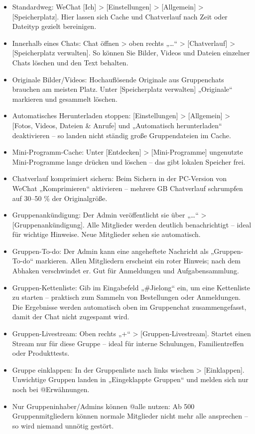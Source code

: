 \begin{itemize}
  \item Standardweg: WeChat [Ich] > [Einstellungen] > [Allgemein] > [Speicherplatz]. Hier lassen sich Cache und Chatverlauf nach Zeit oder Dateityp gezielt bereinigen.
  \item Innerhalb eines Chats: Chat öffnen > oben rechts „…“ > [Chatverlauf] > [Speicherplatz verwalten]. So können Sie Bilder, Videos und Dateien einzelner Chats löschen und den Text behalten.
  \item Originale Bilder/Videos: Hochauflösende Originale aus Gruppenchats brauchen am meisten Platz. Unter [Speicherplatz verwalten] „Originale“ markieren und gesammelt löschen.
  \item Automatisches Herunterladen stoppen: [Einstellungen] > [Allgemein] > [Fotos, Videos, Dateien \& Anrufe] und „Automatisch herunterladen“ deaktivieren – so landen nicht ständig große Gruppendateien im Cache.
  \item Mini-Programm-Cache: Unter [Entdecken] > [Mini-Programme] ungenutzte Mini-Programme lange drücken und löschen – das gibt lokalen Speicher frei.
  \item Chatverlauf komprimiert sichern: Beim Sichern in der PC-Version von WeChat „Komprimieren“ aktivieren – mehrere GB Chatverlauf schrumpfen auf 30–50 \% der Originalgröße.
\end{itemize}


\begin{itemize}
  \item Gruppenankündigung: Der Admin veröffentlicht sie über „…“ > [Gruppenankündigung]. Alle Mitglieder werden deutlich benachrichtigt – ideal für wichtige Hinweise. Neue Mitglieder sehen sie automatisch.
  \item Gruppen-To-do: Der Admin kann eine angeheftete Nachricht als „Gruppen-To-do“ markieren. Allen Mitgliedern erscheint ein roter Hinweis; nach dem Abhaken verschwindet er. Gut für Anmeldungen und Aufgabensammlung.
  \item Gruppen-Kettenliste: Gib im Eingabefeld „\#Jielong“ ein, um eine Kettenliste zu starten – praktisch zum Sammeln von Bestellungen oder Anmeldungen. Die Ergebnisse werden automatisch oben im Gruppenchat zusammengefasst, damit der Chat nicht zugespamt wird.
  \item Gruppen-Livestream: Oben rechts „+“ > [Gruppen-Livestream]. Startet einen Stream nur für diese Gruppe – ideal für interne Schulungen, Familientreffen oder Produkttests.
  \item Gruppe einklappen: In der Gruppenliste nach links wischen > [Einklappen]. Unwichtige Gruppen landen in „Eingeklappte Gruppen“ und melden sich nur noch bei @Erwähnungen.
  \item Nur Gruppeninhaber/Admins können @alle nutzen: Ab 500 Gruppenmitgliedern können normale Mitglieder nicht mehr alle ansprechen – so wird niemand unnötig gestört.
\end{itemize}

